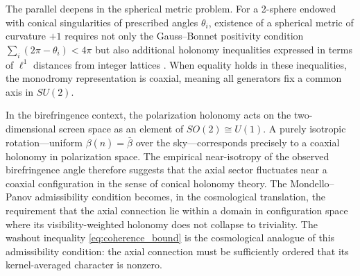 \documentclass[12pt]{article}
\theoremstyle{definition}
\begin{document}
The parallel deepens in the spherical metric problem. For a 2-sphere endowed with conical singularities of prescribed angles $\theta_i$, existence of a spherical metric of curvature $+1$ requires not only the Gauss--Bonnet positivity condition $\sum_i(2\pi-\theta_i)<4\pi$ but also additional holonomy inequalities expressed in terms of $\ell^1$ distances from integer lattices \cite{MondelloPanov2016,Eremenko2004,Dey2018}. When equality holds in these inequalities, the monodromy representation is coaxial, meaning all generators fix a common axis in $SU(2)$.

In the birefringence context, the polarization holonomy acts on the two-dimensional screen space as an element of $SO(2)\cong U(1)$. A purely isotropic rotation---uniform $\beta(\hat{n})=\bar\beta$ over the sky---corresponds precisely to a coaxial holonomy in polarization space. The empirical near-isotropy of the observed birefringence angle \cite{MinamiKomatsu2020,Eskilt2022,Diego-Palazuelos2023} therefore suggests that the axial sector fluctuates near a coaxial configuration in the sense of conical holonomy theory. The Mondello--Panov admissibility condition becomes, in the cosmological translation, the requirement that the axial connection lie within a domain in configuration space where its visibility-weighted holonomy does not collapse to triviality. The washout inequality \eqref{eq:coherence_bound} is the cosmological analogue of this admissibility condition: the axial connection must be sufficiently ordered that its kernel-averaged character is nonzero.
\end{document}
